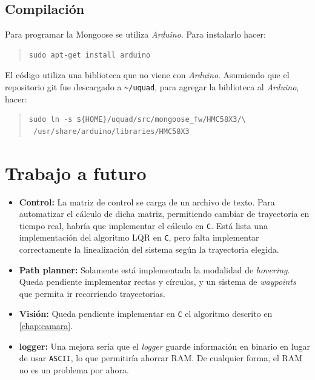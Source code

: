 \documentclass[main]{subfiles}
\begin{document}
\subsection{Compilación}
\label{sec:codigo:compilacion-mongoose}

Para programar la Mongoose se utiliza \textit{Arduino}. Para instalarlo hacer:
\begin{quote}
\begin{verbatim}
sudo apt-get install arduino
\end{verbatim}
\end{quote}

El código utiliza una biblioteca que no viene con \textit{Arduino}. Asumiendo que el repositorio git fue descargado a \verb+~/uquad+, para agregar la biblioteca al \textit{Arduino}, hacer:
\begin{quote}
\begin{verbatim}
sudo ln -s ${HOME}/uquad/src/mongoose_fw/HMC58X3/\
 /usr/share/arduino/libraries/HMC58X3
\end{verbatim}
\end{quote}

\section{Trabajo a futuro}
\label{sec:codigo:trabajo-a-futuro}

\begin{itemize}
\item \textbf{Control:} La matriz de control se carga de un archivo de texto. Para automatizar el cálculo de dicha matriz, permitiendo cambiar de trayectoria en tiempo real, habría que implementar el cálculo en \verb+C+. Está lista una implementación del algoritmo LQR en \verb+C+, pero falta implementar correctamente la linealización del sistema según la trayectoria elegida.
\item \textbf{Path planner:} Solamente está implementada la modalidad de \textit{hovering}. Queda pendiente implementar rectas y círculos, y un sistema de \textit{waypoints} que permita ir recorriendo trayectorias.
\item \textbf{Visión:} Queda pendiente implementar en \verb+C+ el algoritmo descrito en \ref{chap:camara}.
\item \textbf{logger:} Una mejora sería que el \textit{logger} guarde información en binario en lugar de usar \verb+ASCII+, lo que permitiría ahorrar RAM. De cualquier forma, el RAM no es un problema por ahora.
\end{itemize}
\end{document}
